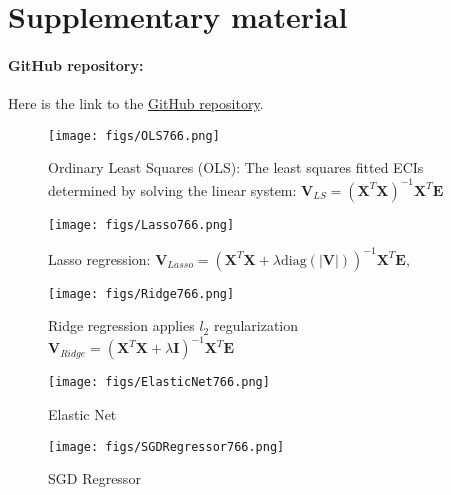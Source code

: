 \documentclass{article}
\begin{document}
\pagebreak
\printbibliography

% 
% 


\pagebreak
\appendix

\section{Supplementary material} \label{app:info}

\paragraph{GitHub repository:}
Here is the link to the \href{https://github.com/valimzztt/CPSC440-Project.git}{GitHub repository}.

\begin{figure}[h!]
    \centering
     \begin{minipage}{0.40\textwidth}
        \texttt{[image: figs/OLS766.png]}
        \caption{Ordinary Least Squares (OLS): The least squares fitted ECIs determined by solving the linear system: \newline 
        $\mathbf{V}_{LS} = \left( \mathbf{X}^T \mathbf{X} \right)^{-1} \mathbf{X}^T \mathbf{E}$}
        \label{fig:fig5}
        \texttt{[image: figs/Lasso766.png]}
        \caption{Lasso regression: $\mathbf{V}_{Lasso} = \left( \mathbf{X}^T \mathbf{X} + \lambda \text{diag}(|\mathbf{V}|) \right)^{-1} \mathbf{X}^T \mathbf{E},$}
        \label{fig:fig6}
    \end{minipage}
    \hfill
     \begin{minipage}{0.40\textwidth}
        \texttt{[image: figs/Ridge766.png]}
        \caption{Ridge regression applies $l_2$ regularization \newline 
        $ \mathbf{V}_{Ridge} = \left( \mathbf{X}^T \mathbf{X} + \lambda \mathbf{I} \right)^{-1} \mathbf{X}^T \mathbf{E}$}
        \label{fig:fig7}
        \texttt{[image: figs/ElasticNet766.png]}
        \caption{Elastic Net}
        \label{fig:fig8}
    \end{minipage}
\label{fig:Experiment2-Fit-Comparison} 
\end{figure}

\begin{figure*}[t]
    \centering
    \texttt{[image: figs/SGDRegressor766.png]}
    \caption{SGD Regressor}
    \label{fig:figsgdregresson}
\end{figure*}
\end{document}
